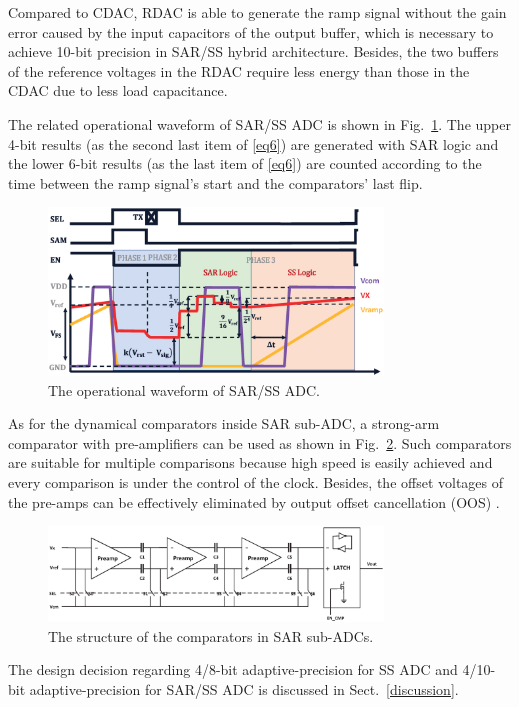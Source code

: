 Compared to CDAC, RDAC is able to generate the ramp signal without the gain error caused by the input capacitors of the output buffer, 
which is necessary to achieve 10-bit precision in SAR/SS hybrid architecture.
Besides, the two buffers of the reference voltages in the RDAC require less energy than those in the CDAC due to less load capacitance.  

The related operational waveform of SAR/SS ADC is shown in Fig.~\ref{SARWAVE}. The upper 4-bit results (as the second last item of \eqref{eq6}) are generated 
with SAR logic and the lower 6-bit results (as the last item of \eqref{eq6}) are counted according to the time between the ramp signal’s start and the comparators’ last flip. 

\begin{figure}[htbp]
	\centerline{\includegraphics[width=3.5in]{./Figures/SARWAVE.eps}}
	\caption{The operational waveform of SAR/SS ADC.}
	\label{SARWAVE}
\end{figure} 

As for the dynamical comparators inside SAR sub-ADC, a strong-arm comparator with pre-amplifiers can be used as shown in Fig.~\ref{LATCH}. Such comparators 
are suitable for multiple comparisons because high speed is easily achieved and every comparison is under the control of the clock. Besides, the offset voltages of the pre-amps can be effectively eliminated by output offset cancellation (OOS) \cite{razavi_design_1992}.

\begin{figure}[htbp]
	\centerline{\includegraphics[width=3.5in]{./Figures/LATCH.eps}}
	\caption{The structure of the comparators in SAR sub-ADCs.}
	\label{LATCH}
\end{figure} 

The design decision regarding 4/8-bit adaptive-precision for SS ADC and 4/10-bit adaptive-precision for SAR/SS ADC is discussed in Sect.~\ref{discussion}.

